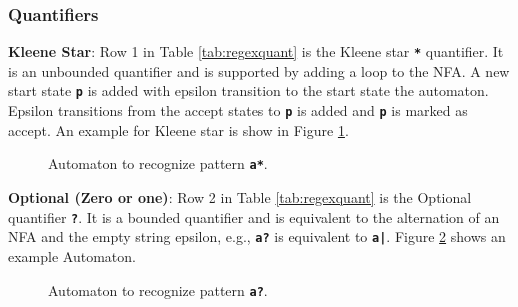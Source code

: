 \subsubsection{Quantifiers}
\textbf{Kleene Star}: Row 1 in Table \ref{tab:regexquant} is the Kleene star \texttt{\textbf{*}} quantifier. It is an unbounded quantifier and is supported by adding a loop to the NFA. A new start state \texttt{\textbf{p}} is added with epsilon transition to the start state the automaton. Epsilon transitions from the accept states to \texttt{\textbf{p}} is added and \texttt{\textbf{p}} is marked as accept. An example for Kleene star is show in Figure \ref{fig:autoq1}.

\begin{figure}[H]
\centering
{}
\caption{Automaton to recognize pattern \texttt{\textbf{a*}}.}
\label{fig:autoq1}
\end{figure}



\noindent
\textbf{Optional (Zero or one)}: Row 2 in Table \ref{tab:regexquant} is the Optional quantifier \texttt{\textbf{?}}. It is a bounded quantifier and is  equivalent to the alternation of an NFA and the empty string epsilon, e.g., \texttt{\textbf{a?}} is equivalent to \texttt{\textbf{a|\epsilon}}. Figure \ref{fig:autoq3} shows an example Automaton.


\begin{figure}[htpb]
\centering
{}
\caption{Automaton to recognize pattern \texttt{\textbf{a?}}.}
\label{fig:autoq3}
\end{figure}

